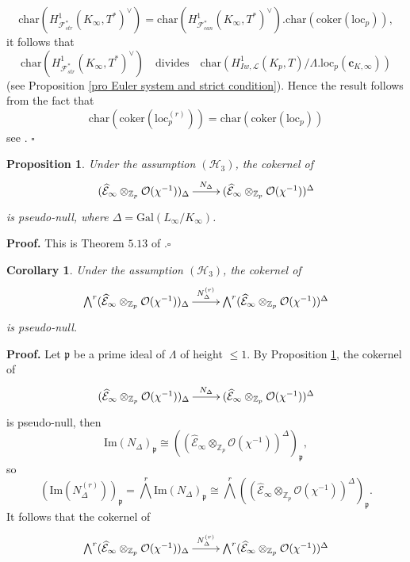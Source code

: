 \documentclass[reqno]{amsart}
\newcounter{dummy} \numberwithin{dummy}{section}
\newtheorem{coro}[dummy]{Corollary}
\newtheorem{pro}[dummy]{Proposition}
\begin{document}
$$
\mathrm{char}(H^{1}_{\mathcal{F}_{str}^{\ast}}(K_{\infty},T^{\ast})^{\vee})=
\mathrm{char}(H^{1}_{\mathcal{F}_{can}^{\ast}}(K_{\infty},T^{\ast})^{\vee}).
\mathrm{char}(\mathrm{coker}(\mathrm{loc}_{p})),
$$
it follows that
$$
\mathrm{char}(H^{1}_{\mathcal{F}_{str}^{\ast}}(K_{\infty},T^{\ast})^{\vee})\quad\mbox{divides}\quad
\mathrm{char}(H^{1}_{Iw,\mathcal{L}}(K_{p},T)/\Lambda.\mathrm{loc}_{p}(\mathbf{c}_{K,\infty}))
$$
(see Proposition \ref{pro Euler system and strict condition}). Hence
the result follows from the fact that
$$
\mathrm{char}(\mathrm{coker}(\mathrm{loc}^{(r)}_{p}))=\mathrm{char}(\mathrm{coker}(\mathrm{loc}_{p}))
$$
see \cite[page 258]{Bourbaki}. \hfill $\square$\vskip 6pt
\begin{pro}\label{Theorem Assim}
Under the assumption $(\mathcal{H}_{3})$, the cokernel of
$$
\xymatrix@=2pc{
(\widehat{\mathcal{E}}_{\infty}\otimes_{\mathbb{Z}_{p}}\mathcal{O}(\chi^{-1}))_{\Delta}
\ar[r]^-{N_{\Delta}}&(\widehat{\mathcal{E}}_{\infty}\otimes_{\mathbb{Z}_{p}}\mathcal{O}(\chi^{-1}))^{\Delta}
}
$$
is pseudo-null, where $\Delta=\mathrm{Gal}(L_{\infty}/K_{\infty})$.
\end{pro}
\noindent \textbf{Proof.} This is Theorem $5.13$ of
\cite{AMO1}.\hfill $\square$
\begin{coro}\label{coker of power N Delta pseudo nul}
Under the assumption $(\mathcal{H}_{3})$, the cokernel of
$$
\xymatrix@=2pc{
\bigwedge^{r}(\widehat{\mathcal{E}}_{\infty}\otimes_{\mathbb{Z}_{p}}\mathcal{O}(\chi^{-1}))_{\Delta}
\ar[r]^-{N^{(r)}_{\Delta}}&\bigwedge^{r}(\widehat{\mathcal{E}}_{\infty}\otimes_{\mathbb{Z}_{p}}\mathcal{O}(\chi^{-1}))^{\Delta}
}
$$
is pseudo-null.
\end{coro}
\noindent \textbf{Proof.} Let $\mathfrak{p}$ be a prime ideal of
$\Lambda$ of height $\leq 1$. By Proposition \ref{Theorem Assim},
the cokernel of
$$
\xymatrix@=2pc{
(\widehat{\mathcal{E}}_{\infty}\otimes_{\mathbb{Z}_{p}}\mathcal{O}(\chi^{-1}))_{\Delta}
\ar[r]^-{N_{\Delta}}&(\widehat{\mathcal{E}}_{\infty}\otimes_{\mathbb{Z}_{p}}\mathcal{O}(\chi^{-1}))^{\Delta}
}
$$ is pseudo-null, then
$$\mathrm{Im}(N_{\Delta})_{\mathfrak{p}}\cong
((\widehat{\mathcal{E}}_{\infty}\otimes_{\mathbb{Z}_{p}}\mathcal{O}(\chi^{-1}))^{\Delta})_{\mathfrak{p}},
$$
so
$$
(\mathrm{Im}(N^{(r)}_{\Delta}))_{\mathfrak{p}}=\bigwedge^{r}\mathrm{Im}(N_{\Delta})_{\mathfrak{p}}\cong
\bigwedge^{r}((\widehat{\mathcal{E}}_{\infty}\otimes_{\mathbb{Z}_{p}}\mathcal{O}(\chi^{-1}))^{\Delta})_{\mathfrak{p}}.
$$
It follows that the cokernel of
$$
\xymatrix@=2pc{
\bigwedge^{r}(\widehat{\mathcal{E}}_{\infty}\otimes_{\mathbb{Z}_{p}}\mathcal{O}(\chi^{-1}))_{\Delta}
\ar[r]^-{N^{(r)}_{\Delta}}&\bigwedge^{r}(\widehat{\mathcal{E}}_{\infty}\otimes_{\mathbb{Z}_{p}}\mathcal{O}(\chi^{-1}))^{\Delta}
}
$$
\end{document}

